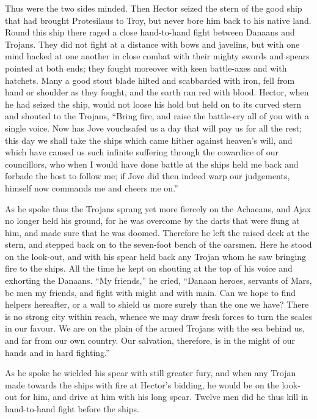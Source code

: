 Thus were the two sides minded. Then Hector seized the stern of the good
ship that had brought Protesilaus to Troy, but never bore him back to his
native land. Round this ship there raged a close hand-to-hand fight
between Danaans and Trojans. They did not fight at a distance with bows
and javelins, but with one mind hacked at one another in close combat with
their mighty swords and spears pointed at both ends; they fought moreover
with keen battle-axes and with hatchets. Many a good stout blade hilted
and scabbarded with iron, fell from hand or shoulder as they fought, and
the earth ran red with blood. Hector, when he had seized the ship, would
not loose his hold but held on to its curved stern and shouted to the
Trojans, “Bring fire, and raise the battle-cry all of you with a single
voice. Now has Jove vouchsafed us a day that will pay us for all the rest;
this day we shall take the ships which came hither against heaven’s will,
and which have caused us such infinite suffering through the cowardice of
our councillors, who when I would have done battle at the ships held me
back and forbade the host to follow me; if Jove did then indeed warp our
judgements, himself now commands me and cheers me on.”

As he spoke thus the Trojans sprang yet more fiercely on the Achaeans, and
Ajax no longer held his ground, for he was overcome by the darts that were
flung at him, and made sure that he was doomed. Therefore he left the
raised deck at the stern, and stepped back on to the seven-foot bench of
the oarsmen. Here he stood on the look-out, and with his spear held back
any Trojan whom he saw bringing fire to the ships. All the time he kept on
shouting at the top of his voice and exhorting the Danaans. “My friends,”
he cried, “Danaan heroes, servants of Mars, be men my friends, and fight
with might and with main. Can we hope to find helpers hereafter, or a wall
to shield us more surely than the one we have? There is no strong city
within reach, whence we may draw fresh forces to turn the scales in our
favour. We are on the plain of the armed Trojans with the sea behind us,
and far from our own country. Our salvation, therefore, is in the might of
our hands and in hard fighting.”

As he spoke he wielded his spear with still greater fury, and when any
Trojan made towards the ships with fire at Hector’s bidding, he would be
on the look-out for him, and drive at him with his long spear. Twelve men
did he thus kill in hand-to-hand fight before the ships.

